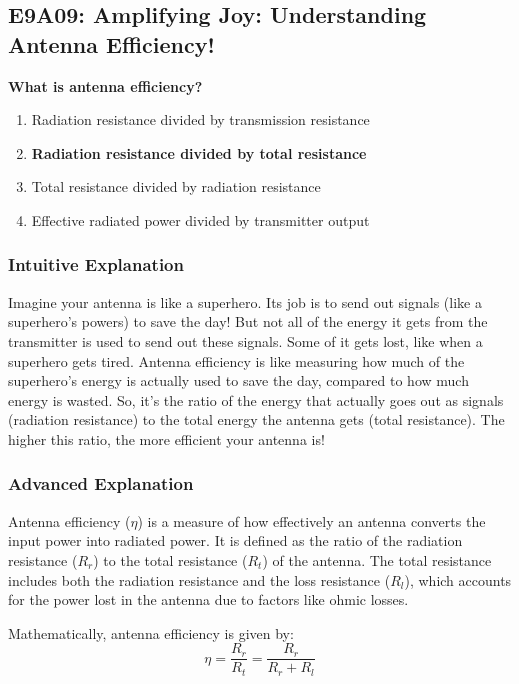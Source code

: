 \subsection{E9A09: Amplifying Joy: Understanding Antenna Efficiency!}

\begin{tcolorbox}[colback=gray!10!white,colframe=black!75!black,title=\textbf{Question E9A09}]
\textbf{What is antenna efficiency?}
\begin{enumerate}[label=\Alph*)]
    \item Radiation resistance divided by transmission resistance
    \item \textbf{Radiation resistance divided by total resistance}
    \item Total resistance divided by radiation resistance
    \item Effective radiated power divided by transmitter output
\end{enumerate}
\end{tcolorbox}

\subsubsection{Intuitive Explanation}
Imagine your antenna is like a superhero. Its job is to send out signals (like a superhero's powers) to save the day! But not all of the energy it gets from the transmitter is used to send out these signals. Some of it gets lost, like when a superhero gets tired. Antenna efficiency is like measuring how much of the superhero's energy is actually used to save the day, compared to how much energy is wasted. So, it's the ratio of the energy that actually goes out as signals (radiation resistance) to the total energy the antenna gets (total resistance). The higher this ratio, the more efficient your antenna is!

\subsubsection{Advanced Explanation}
Antenna efficiency (\(\eta\)) is a measure of how effectively an antenna converts the input power into radiated power. It is defined as the ratio of the radiation resistance (\(R_r\)) to the total resistance (\(R_t\)) of the antenna. The total resistance includes both the radiation resistance and the loss resistance (\(R_l\)), which accounts for the power lost in the antenna due to factors like ohmic losses.

Mathematically, antenna efficiency is given by:
\[
\eta = \frac{R_r}{R_t} = \frac{R_r}{R_r + R_l}
\]

